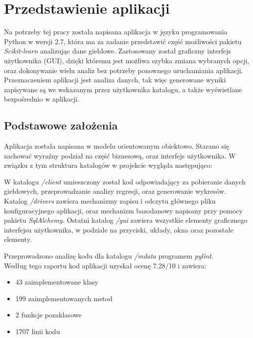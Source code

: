 
\chapter{Przedstawienie aplikacji}
Na potrzeby tej pracy została napisana aplikacja w języku programowania Python w wersji 2.7, która ma za zadanie przedstawić część możliwości pakietu \textit{Scikit-learn} analizując dane giełdowe.
Zastosowany został graficzny interfejs użytkownika (GUI), dzięki któremu jest możliwa szybka zmiana wybranych opcji, oraz dokonywanie wielu analiz bez potrzeby ponownego uruchamiania aplikacji.
Przeznaczeniem aplikacji jest analiza danych, tak więc generowane wyniki zapisywane są we wskazanym przez użytkownika katalogu, a także wyświetlane bezpośrednio w aplikacji.

\section{Podstawowe założenia}
Aplikacja została napisana w modelu orientowanym obiektowo. Starano się zachować wyraźny podział na część biznesową, oraz interfejs użytkownika. W związku z tym struktura katalogów w projekcie wygląda następująco:

W katalogu \textit{/client} umieszczony został kod odpowiadający za pobieranie danych giełdowych, przeprowadzanie analizy regresji, oraz generowanie wykresów.
Katalog \textit{/drivers} zawiera mechanizmy zapisu i odczytu głównego pliku konfiguracyjnego aplikacji, oraz mechanizm bazodanowy napisany przy pomocy pakietu \textit{SqlAlchemy}.
Ostatni katalog \textit{/gui} zawiera wszystkie elementy graficznego interfejsu użytkownika, w podziale na przyciski, układy, okna oraz pozostałe elementy.

Przeprowadzono analizę kodu dla katalogu \textit{/mdata} programem \textit{pylint}.\\
Według tego raportu kod aplikacji uzyskał ocenę 7.28/10 i zawiera:
\begin{itemize}
 \item 43 zaimplementowane klasy
 \item 199 zaimplementowanych metod
 \item 2 funkcje pozaklasowe
 \item 1707 linii kodu
\end{itemize}


